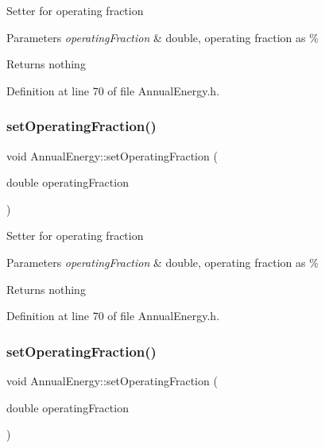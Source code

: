 Setter for operating fraction


\begin{DoxyParams}{Parameters}
{\em operating\+Fraction} & double, operating fraction as \%\\
\hline
\end{DoxyParams}
\begin{DoxyReturn}{Returns}
nothing 
\end{DoxyReturn}


Definition at line 70 of file Annual\+Energy.\+h.

\mbox{\label{class_annual_energy_a5c127c7d5e2a5e4f50559f8b546e8998}} 
\subsubsection{\texorpdfstring{set\+Operating\+Fraction()}{setOperatingFraction()}\hspace{0.1cm}{\footnotesize\ttfamily [2/3]}}
{\footnotesize\ttfamily void Annual\+Energy\+::set\+Operating\+Fraction (\begin{DoxyParamCaption}\item[{double}]{operating\+Fraction }\end{DoxyParamCaption})\hspace{0.3cm}{\ttfamily [inline]}}

Setter for operating fraction


\begin{DoxyParams}{Parameters}
{\em operating\+Fraction} & double, operating fraction as \%\\
\hline
\end{DoxyParams}
\begin{DoxyReturn}{Returns}
nothing 
\end{DoxyReturn}


Definition at line 70 of file Annual\+Energy.\+h.

\mbox{\label{class_annual_energy_a5c127c7d5e2a5e4f50559f8b546e8998}} 
\subsubsection{\texorpdfstring{set\+Operating\+Fraction()}{setOperatingFraction()}\hspace{0.1cm}{\footnotesize\ttfamily [3/3]}}
{\footnotesize\ttfamily void Annual\+Energy\+::set\+Operating\+Fraction (\begin{DoxyParamCaption}\item[{double}]{operating\+Fraction }\end{DoxyParamCaption})\hspace{0.3cm}{\ttfamily [inline]}}

